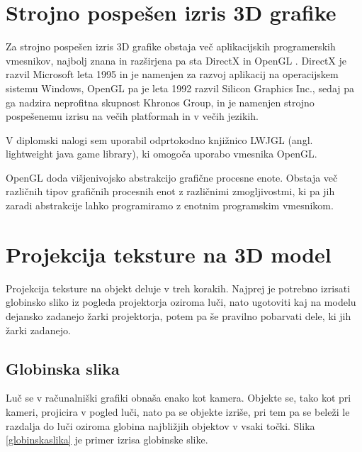 \documentclass[a4paper, 12pt]{book}
\begin{document}
\section{Strojno pospešen izris 3D grafike}
Za strojno pospešen izris 3D grafike obstaja več aplikacijskih programerskih vmesnikov, najbolj znana in razširjena pa sta DirectX \cite{DirectX} in OpenGL \cite{OpenGL}. DirectX je razvil Microsoft leta 1995 in je namenjen za razvoj aplikacij na operacijskem sistemu Windows, OpenGL pa je leta 1992 razvil Silicon Graphics Inc., sedaj pa ga nadzira neprofitna skupnost Khronos Group, in je namenjen strojno pospešenemu izrisu na večih platformah in v večih jezikih. 

V diplomski nalogi sem uporabil odprtokodno knjižnico LWJGL (angl. lightweight java game library), ki omogoča uporabo vmesnika OpenGL.

OpenGL doda višjenivojsko abstrakcijo grafične procesne enote. Obstaja več različnih tipov grafičnih procesnih enot z različnimi zmogljivostmi, ki pa jih zaradi abstrakcije lahko programiramo z enotnim programskim vmesnikom. 
\section{Projekcija teksture na 3D model}

Projekcija teksture na objekt deluje v treh korakih. Najprej je potrebno izrisati globinsko sliko iz pogleda projektorja oziroma luči, nato ugotoviti kaj na modelu dejansko zadanejo žarki projektorja, potem pa še pravilno pobarvati dele, ki jih žarki zadanejo.
\subsection*{Globinska slika}
Luč se v računalniški grafiki obnaša enako kot kamera. Objekte se, tako kot pri kameri, projicira v pogled luči, nato pa se objekte izriše, pri tem pa se beleži le razdalja do luči oziroma globina najbližjih objektov v vsaki točki. Slika \ref{globinskaslika} je primer izrisa globinske slike.
\end{document}
